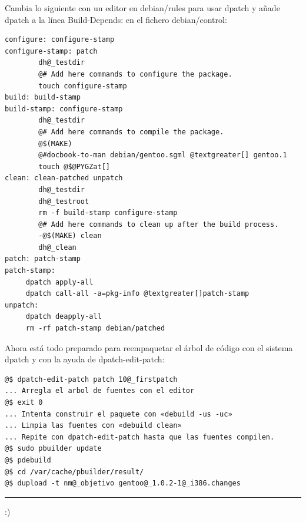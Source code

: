 \documentclass[letterpaper,12pt,spanish]{manual}
\begin{document}
Cambia lo siguiente con un editor en debian/rules para usar dpatch y añade dpatch a la línea Build-Depends: en el fichero debian/control:

\begin{Verbatim}[commandchars=@\[\]]
configure: configure-stamp
configure-stamp: patch
        dh@_testdir
        @# Add here commands to configure the package.
        touch configure-stamp
build: build-stamp
build-stamp: configure-stamp
        dh@_testdir
        @# Add here commands to compile the package.
        @$(MAKE)
        @#docbook-to-man debian/gentoo.sgml @textgreater[] gentoo.1
        touch @$@PYGZat[]
clean: clean-patched unpatch
        dh@_testdir
        dh@_testroot
        rm -f build-stamp configure-stamp
        @# Add here commands to clean up after the build process.
        -@$(MAKE) clean
        dh@_clean
patch: patch-stamp
patch-stamp:
     dpatch apply-all
     dpatch call-all -a=pkg-info @textgreater[]patch-stamp
unpatch:
     dpatch deapply-all
     rm -rf patch-stamp debian/patched
\end{Verbatim}

Ahora está todo preparado para reempaquetar el árbol de código con el sistema dpatch y con la ayuda de dpatch-edit-patch:

\begin{Verbatim}[commandchars=@\[\]]
@$ dpatch-edit-patch patch 10@_firstpatch
... Arregla el arbol de fuentes con el editor
@$ exit 0
... Intenta construir el paquete con «debuild -us -uc»
... Limpia las fuentes con «debuild clean»
... Repite con dpatch-edit-patch hasta que las fuentes compilen.
@$ sudo pbuilder update
@$ pdebuild
@$ cd /var/cache/pbuilder/result/
@$ dupload -t nm@_objetivo gentoo@_1.0.2-1@_i386.changes
\end{Verbatim}


\bigskip\hrule{}\bigskip


:)


\renewcommand{\indexname}{Índice de Módulos}
\printmodindex
\renewcommand{\indexname}{Índice}
\printindex
\end{document}
